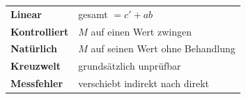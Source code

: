 \begin{merksatz}
\begin{center}
\renewcommand{\arraystretch}{1.5}
\begin{tabular}{@{}P{3.0cm}P{5.6cm}@{}}
\toprule
\textbf{Linear} & gesamt $= c' + ab$\\
\textbf{Kontrolliert} & $M$ auf einen Wert zwingen\\
\textbf{Natürlich} & $M$ auf seinen Wert ohne Behandlung\\
\textbf{Kreuzwelt} & grundsätzlich unprüfbar\\
\textbf{Messfehler} & verschiebt indirekt nach direkt\\
\bottomrule
\end{tabular}
\end{center}

\begin{center}
\begin{minipage}{0.88\textwidth}
\end{minipage}
\end{center}
\end{merksatz}
